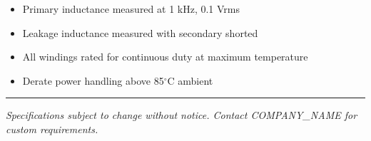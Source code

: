 \documentclass[10pt,a4paper]{article}
\begin{document}
\footnotesize
\begin{itemize}
    \setlength{\itemsep}{1pt}
    \item Primary inductance measured at 1 kHz, 0.1 Vrms
    \item Leakage inductance measured with secondary shorted
    \item All windings rated for continuous duty at maximum temperature
    \item Derate power handling above 85$^\circ$C ambient
\end{itemize}

\vspace{5mm}
\hrule
\vspace{2mm}
\footnotesize
\textit{Specifications subject to change without notice. Contact {{COMPANY_NAME}} for custom requirements.}
\end{document}

